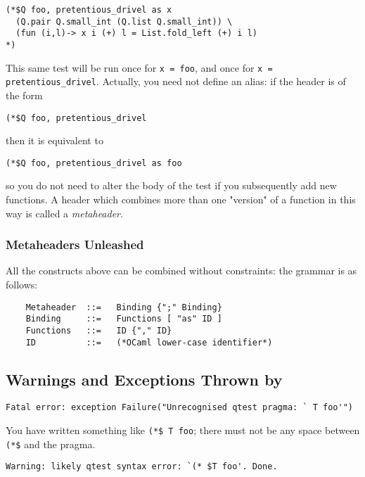 \documentclass[a4paper,12pt]{article}
\begin{document}
\begin{verbatim}
(*$Q foo, pretentious_drivel as x
  (Q.pair Q.small_int (Q.list Q.small_int)) \
  (fun (i,l)-> x i (+) l = List.fold_left (+) i l)
*)
\end{verbatim}

This same test will be run once for \texttt{x = foo}, and once for \texttt{x = pretentious\_drivel}.
Actually, you need not define an alias: if the header is of the form
    
\begin{verbatim}
(*$Q foo, pretentious_drivel
\end{verbatim}

then it is equivalent to

\begin{verbatim}
(*$Q foo, pretentious_drivel as foo
\end{verbatim}

so you do not need to alter the body of the test if you subsequently add new functions. A
header which combines more than one "version" of a function in this way is called a
\emph{metaheader}.

\subsubsection{Metaheaders Unleashed}

All the constructs above can be combined without constraints: the grammar is as follows:

\begin{verbatim}
    Metaheader  ::=   Binding {";" Binding}
    Binding     ::=   Functions [ "as" ID ]
    Functions   ::=   ID {"," ID}
    ID          ::=   (*OCaml lower-case identifier*)
\end{verbatim}

\subsection{Warnings and Exceptions Thrown by \qtest{}}

\Oconsole
\begin{verbatim}
Fatal error: exception Failure("Unrecognised qtest pragma: ` T foo'")
\end{verbatim}

You have written something like \texttt{(*\$ T foo}; there must not be any space
between \texttt{(*\$} and
the pragma.

\begin{verbatim}
Warning: likely qtest syntax error: `(* $T foo'. Done.
\end{verbatim}
\end{document}
